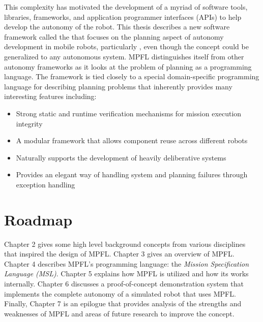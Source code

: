 This complexity has motivated the development of a myriad of software tools, libraries, frameworks, and application programmer interfaces (APIs) to help develop the autonomy of the robot. This thesis describes a new software framework called the  that focuses on the planning aspect of autonomy development in mobile robots, particularly , even though the concept could be generalized to any autonomous system. MPFL distinguishes itself from other autonomy frameworks as it looks at the problem of planning as a programming language. The framework is tied closely to a special domain-specific programming language for describing planning problems that inherently provides many interesting features including:
\begin{itemize}
\item Strong static and runtime verification mechanisms for mission execution integrity
\item A modular framework that allows component reuse across different robots
\item Naturally supports the development of heavily deliberative systems
\item Provides an elegant way of handling system and planning failures through exception handling
\end{itemize}

\section{Roadmap}
Chapter 2 gives some high level background concepts from various disciplines that inspired the design of MPFL. Chapter 3  gives an overview of MPFL. Chapter 4 describes MPFL's programming language: the \textit{Mission Specification Language (MSL)}. Chapter 5  explains how MPFL is utilized and how its works internally. Chapter 6 discusses a proof-of-concept demonstration system that implements the complete autonomy of a simulated robot that uses MPFL. Finally, Chapter 7 is an epilogue that provides analysis of the strengths and weaknesses of MPFL and areas of future research to improve the concept.

